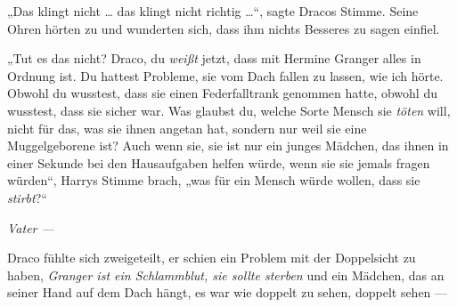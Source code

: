 „Das klingt nicht … das klingt nicht richtig …“, sagte Dracos Stimme. Seine Ohren hörten zu und wunderten sich, dass ihm nichts Besseres zu sagen einfiel.

„Tut es das nicht? Draco, du \emph{weißt} jetzt, dass mit Hermine Granger alles in Ordnung ist. Du hattest Probleme, sie vom Dach fallen zu lassen, wie ich hörte. Obwohl du wusstest, dass sie einen Federfalltrank genommen hatte, obwohl du wusstest, dass sie sicher war. Was glaubst du, welche Sorte Mensch sie \emph{töten} will, nicht für das, was sie ihnen angetan hat, sondern nur weil sie eine Muggelgeborene ist? Auch wenn sie, sie ist nur ein junges Mädchen, das ihnen in einer Sekunde bei den Hausaufgaben helfen würde, wenn sie sie jemals fragen würden“, Harrys Stimme brach, „was für ein Mensch würde wollen, dass sie \emph{stirbt}?“

\emph{Vater —}

Draco fühlte sich zweigeteilt, er schien ein Problem mit der Doppelsicht zu haben, \emph{Granger ist ein Schlammblut, sie sollte sterben} und ein Mädchen, das an seiner Hand auf dem Dach hängt, es war wie doppelt zu sehen, doppelt sehen —

